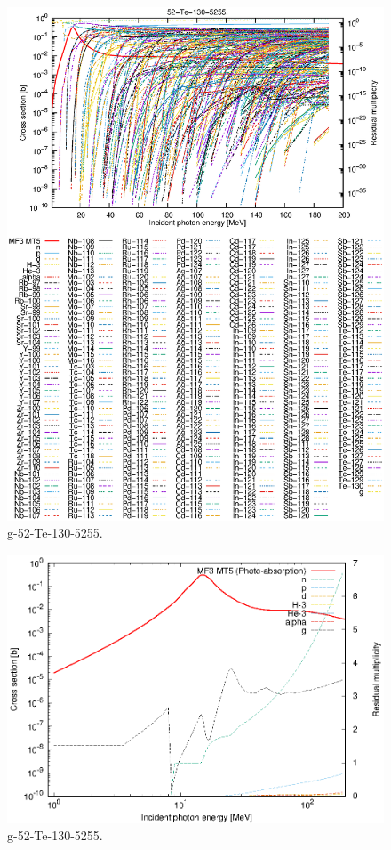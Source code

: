 \begin{figure}
 \includegraphics[width=\linewidth]{eps/g_52-Te-130_5255.eps}
  \caption{g-52-Te-130-5255.}
\end{figure}
\newpage \clearpage

\begin{figure}
 \includegraphics[width=\linewidth]{eps-log/g_52-Te-130_5255.eps}
 \caption{g-52-Te-130-5255.}
\end{figure}
\newpage \clearpage

